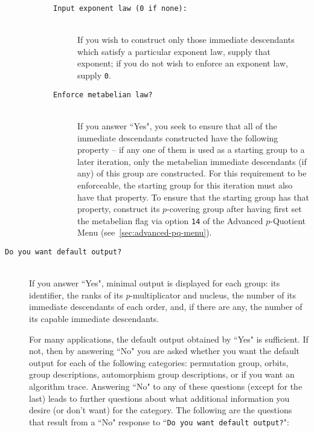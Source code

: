 \documentclass[12pt]{article}
\begin{document}
\begin{description}
\begin{description}
\begin{description}
    \item[\texttt{Input exponent law (0 if none):}]\ \\
     If you wish to construct only those immediate descendants
     which satisfy a particular exponent law, supply that exponent; if 
     you do not wish to enforce an exponent law, supply \texttt{0}.

    \item[\texttt{Enforce metabelian law?}]\ \\
     If you answer ``Yes", you seek to ensure that all of the immediate
     descendants constructed have the following property -- if any one of them 
     is used as a starting group to a later iteration, only the metabelian
     immediate descendants (if any) of this group are constructed.
     For this requirement to be enforceable, the starting group for 
     this iteration must also have that property. To ensure that the
     starting group has that property, construct its $p$-covering group 
     after having first set the metabelian flag via option \texttt{14} of 
     the Advanced $p$-Quotient Menu (see~\ref{sec:advanced-pq-menu}).
  \end{description}
 \end{description}

\item[\texttt{Do you want default output?}]\ \\
If you answer ``Yes", minimal output is displayed for each group: 
its identifier, the ranks of its {\it p}-multiplicator and nucleus, 
the number of its immediate descendants of each order, and, if there are any,
the number of its capable immediate descendants.

For many applications, the default output obtained by ``Yes" is sufficient.
If not, then by answering ``No" you are asked whether you want the
default output for each of the following categories:
permutation group, orbits, group descriptions, automorphism group
descriptions, or if you want an algorithm trace. Answering ``No" to 
any of these questions (except for the last)
leads to further questions about what additional information you desire
(or don't want) for the category. The following are the questions that 
result from a ``No" response to ``\texttt{Do you want default output?}":


\end{description}
\end{document}
